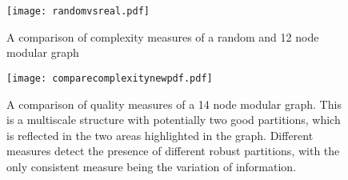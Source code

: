 \begin{figure}[h]
  \centering
 \texttt{[image: randomvsreal.pdf]}
  \caption%
 {A comparison of  complexity measures of a random and 12 node modular graph} \label{fig:comprandomnormal}
\end{figure}

\begin{figure}[h]
  \centering
 \texttt{[image: comparecomplexitynewpdf.pdf]}
  \caption%
 {A comparison of quality measures of a 14 node modular graph.  This is a multiscale structure with potentially two good partitions, which is reflected in the two areas highlighted in the graph.  Different measures detect the presence of different robust partitions, with the only consistent measure being the variation of information.} \label{fig:complexityComparison}
\end{figure}